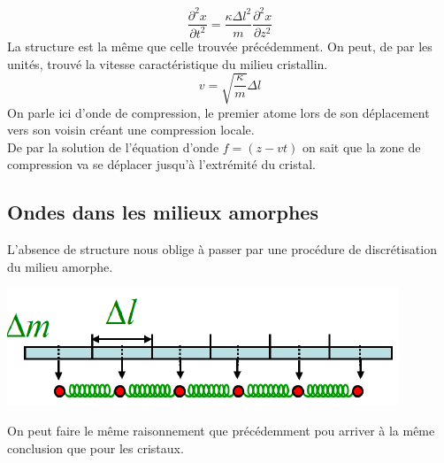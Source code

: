 \documentclass	[11pt, a4paper, openany]{book}
\begin{document}
\begin{equation}
\frac{\partial^2 x}{\partial t^2} = \frac{\kappa\Delta l^2}{m}\frac{\partial^2x}{\partial z^2}
\end{equation}
La structure est la même que celle trouvée précédemment.  On peut, de par les unités, trouvé la vitesse caractéristique du milieu cristallin.
\begin{equation}
v = \sqrt{\frac{\kappa}{m}}\Delta l
\end{equation}
On parle ici d'onde de compression, le premier atome lors de son déplacement vers son voisin créant une compression locale.\\
De par la solution de l'équation d'onde $f = (z - vt)$ on sait que la zone de compression va se déplacer jusqu'à l'extrémité du cristal.

\subsection{Ondes dans les milieux amorphes}
L'absence de structure nous oblige à passer par une procédure de discrétisation du milieu amorphe. 
\begin{center}
\includegraphics[scale=0.4]{oo/image27.png}
\end{center}
On peut faire le même raisonnement que précédemment pou arriver à la même conclusion que pour les cristaux.
\end{document}
